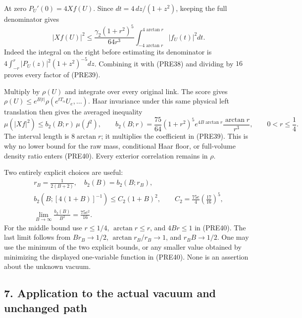 \documentclass[11pt]{article}
\begin{document}
At zero \(P_U'(0)=4Xf(U)\). Since \(dt=4\,dz/(1+z^2)\), keeping the full denominator gives
\[
 |Xf(U)|^2
 \le\frac{\gamma_2(1+r^2)^5}{64r^3}
       \int_{-4\arctan r}^{4\arctan r}|f_U(t)|^2dt .
 \tag{PRE39}
\]
Indeed the integral on the right before estimating its denominator is
\(4\int_{-r}^r|P_U(z)|^2(1+z^2)^{-5}dz\).
Combining it with (PRE38) and dividing by \(16\) proves every factor of (PRE39).

Multiply by \(\rho(U)\) and integrate over every original link. The score gives \(\rho(U)\le e^{B|t|}\rho(e^{tT_\alpha}U_e,\ldots)\). Haar invariance under this same physical left translation then gives the averaged inequality
\[
 \mu(|Xf|^2)\le b_2(B;r)\,\mu(f^2),\qquad
 b_2(B;r)=\frac{75}{64}
      (1+r^2)^5 e^{4B\arctan r}\frac{\arctan r}{r^3},
 \qquad 0<r\le\frac14.
 \tag{PRE40}
\]
The interval length is \(8\arctan r\); it multiplies the coefficient in (PRE39). This is why no lower bound for the raw mass, conditional Haar floor, or full-volume density ratio enters (PRE40). Every exterior correlation remains in \(\rho\).

Two entirely explicit choices are useful:
\[
 \begin{gathered}
 r_B=\frac1{2(B+2)},\quad b_2(B)=b_2(B;r_B),\\
 b_2(B;[4(1+B)]^{-1})
      \le C_2(1+B)^2,\qquad
 C_2=\frac{75e}{4}\left(\frac{17}{16}\right)^5,\\
 \lim_{B\to\infty}\frac{b_2(B)}{B^2}
      =\frac{75e^2}{16}.
 \end{gathered}\tag{PRE41}
\]
For the middle bound use \(r\le1/4\), \(\arctan r\le r\), and
\(4Br\le1\) in (PRE40). The last limit follows from
\(Br_B\to1/2\), \(\arctan r_B/r_B\to1\), and \(r_BB\to1/2\).
One may use the minimum of the two explicit bounds, or any smaller value obtained by minimizing the displayed one-variable function in (PRE40). None is an assertion about the unknown vacuum.

\subsection*{7. Application to the actual vacuum and unchanged path}
\end{document}
